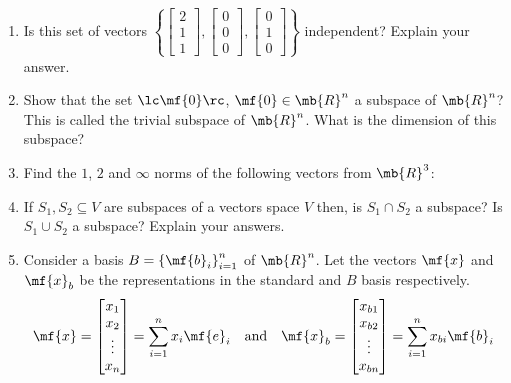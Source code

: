 \begin{enumerate}
    \item Is this set of vectors $\left\{\begin{bmatrix}2 \\ 1 \\ 1\end{bmatrix}, \begin{bmatrix}0 \\ 0\\ 0\end{bmatrix}, \begin{bmatrix}0 \\ 1 \\ 0\end{bmatrix}\right\}$ independent? Explain your answer.
    
    \item Show that the set $\lc \mf{0} \rc$, $\mf{0} \in \mb{R}^n$ a subspace of $\mb{R}^n$? This is called the trivial subspace of $\mb{R}^n$. What is the dimension of this subspace?
    
    \item Find the $1$, $2$ and $\infty$ norms of the following vectors from $\mb{R}^3$:
    

    \item If $S_1, S_2 \subseteq V$ are subspaces of a vectors space $V$ then, is $S_1 \cap S_2$ a subspace? Is $S_1 \cup S_2$ a subspace? Explain your answers.

    \item Consider a basis $B = \left\{\mf{b}_i\right\}_{i=1}^{n}$ of $\mb{R}^n$. Let the vectors $\mf{x}$ and $\mf{x}_b$ be the representations in the standard and $B$ basis respectively. 
    \[ \mf{x} = \begin{bmatrix*}x_1\\x_2\\\vdots\\x_n\end{bmatrix*} = \sum_{i=1}^{n}x_i\mf{e}_i \quad \text{and} \quad \mf{x}_b =  \begin{bmatrix*}x_{b1}\\x_{b2}\\\vdots\\x_{bn}\end{bmatrix*} = \sum_{i=1}^{n}x_{bi}\mf{b}_i \]


\end{enumerate}
